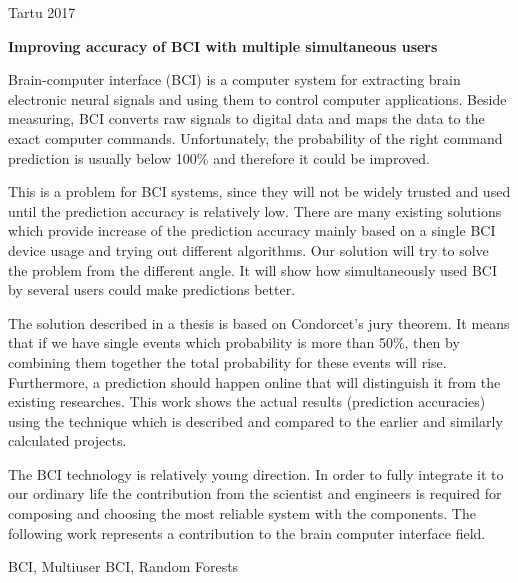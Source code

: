 \documentclass[12pt]{article}
\begin{document}
\vfill
\centerline{Tartu 2017}



\newpage
{}
\noindent\textbf{\large Improving accuracy of BCI with multiple simultaneous users}
\vspace*{2ex}
{ }

Brain-computer interface (BCI) is a computer system for extracting brain electronic neural signals and using them to control computer applications. Beside measuring, BCI converts raw signals to digital data and maps the data to the exact computer commands. Unfortunately, the probability of the right command prediction is usually below 100\% and therefore it could be improved.

This is a problem for BCI systems, since they will not be widely trusted and used until the prediction accuracy is relatively low. There are many existing solutions which provide increase of the prediction accuracy mainly based on a single BCI device usage and trying out different algorithms. Our solution will try to solve the problem from the different angle. It will show how simultaneously used BCI by several users could make predictions better.

The solution described in a thesis is based on Condorcet's jury theorem. It means that if we have single events which probability is more than 50\%, then by combining them together the total probability for these events will rise. Furthermore, a prediction should happen online that will distinguish it from the existing researches. This work shows the actual results (prediction accuracies) using the technique which is described and compared to the earlier and similarly calculated projects.

The BCI technology is relatively young direction. In order to fully integrate it to our ordinary life the contribution from the scientist and engineers is required for composing and choosing the most reliable system with the components. The following work represents a contribution to the brain computer interface field.


\vspace*{3ex}
{}
BCI, Multiuser BCI, Random Forests
\vspace*{3ex}
\end{document}
